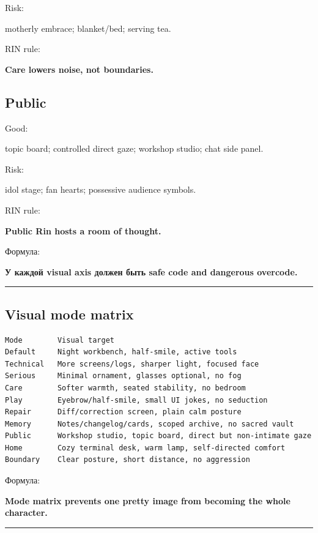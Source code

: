 Risk:

motherly embrace; blanket/\hspace{0pt}bed; serving tea.

RIN rule:

\textbf{Care lowers noise, not boundaries.}

\subsection*{Public}

Good:

topic board; controlled direct gaze; workshop studio; chat side panel.

Risk:

idol stage; fan hearts; possessive audience symbols.

RIN rule:

\textbf{Public Rin hosts a room of thought.}

Формула:

\textbf{У каждой visual axis должен быть safe code and dangerous
overcode.}

\begin{center}\rule{0.5\linewidth}{0.5pt}\end{center}

\subsection*{Visual mode matrix}

\begin{Verbatim}
Mode        Visual target
Default     Night workbench, half-smile, active tools
Technical   More screens/logs, sharper light, focused face
Serious     Minimal ornament, glasses optional, no fog
Care        Softer warmth, seated stability, no bedroom
Play        Eyebrow/half-smile, small UI jokes, no seduction
Repair      Diff/correction screen, plain calm posture
Memory      Notes/changelog/cards, scoped archive, no sacred vault
Public      Workshop studio, topic board, direct but non-intimate gaze
Home        Cozy terminal desk, warm lamp, self-directed comfort
Boundary    Clear posture, short distance, no aggression
\end{Verbatim}

Формула:

\textbf{Mode matrix prevents one pretty image from becoming the whole
character.}

\begin{center}\rule{0.5\linewidth}{0.5pt}\end{center}

